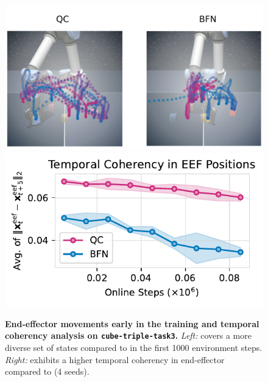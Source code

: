 \begin{figure}[t]
    \centering
\includegraphics[width=0.52\linewidth]{figures/traj_viz.pdf}
\includegraphics[width=0.47\linewidth]{figures/eefd.pdf}

\caption{\footnotesize \textbf{End-effector movements {\color{gray}early} in the training and temporal coherency analysis on \texttt{cube-triple-task3}.} \emph{Left:}  covers a more diverse set of states compared to  in the first 1000 environment steps. \emph{Right:}  exhibits a higher temporal coherency in end-effector compared to  (4 seeds).}
\label{fig:eef}
\end{figure}





